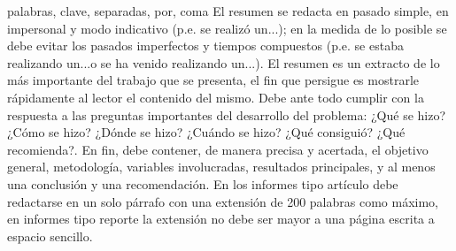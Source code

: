 \begin{resumen}{palabras, clave, separadas, por, coma}
	El resumen se redacta en pasado simple, en impersonal y modo indicativo (p.e. se realizó un...); en la medida de lo posible se debe evitar los pasados imperfectos y tiempos compuestos (p.e. se estaba realizando un...o se ha venido realizando un...). El resumen es un extracto de lo más importante del trabajo que se presenta, el fin que persigue es mostrarle rápidamente al lector el contenido del mismo. Debe ante todo cumplir con la respuesta a las preguntas importantes del desarrollo del problema: ¿Qué se hizo? ¿Cómo se hizo? ¿Dónde se hizo? ¿Cuándo se hizo? ¿Qué consiguió? ¿Qué recomienda?. En fin, debe contener, de manera precisa y acertada, el objetivo general, metodología, variables involucradas, resultados principales, y al menos una conclusión y una recomendación. En los informes tipo artículo debe redactarse en un solo párrafo con una extensión de 200 palabras como máximo, en informes tipo reporte la extensión no debe ser mayor a una página escrita a espacio sencillo.
\end{resumen}
